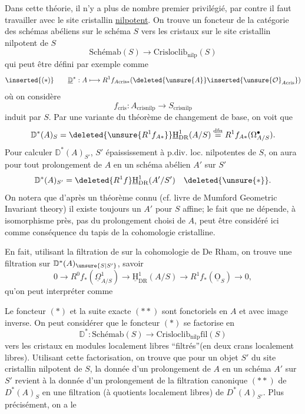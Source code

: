  Dans cette théorie, il n'y a plus de nombre premier privilégié, par contre il faut travailler avec le site cristallin \uline{nilpotent}. On trouve un foncteur  de la catégorie des schémas abéliens sur le schéma $S$ vers les  cristaux sur le site cristallin nilpotent de $S$
\[
\text{Schémab}(S)\longrightarrow\mathrm{Crisloclib}_{\mathrm{nilp}}(S)
\]
qui peut être défini par exemple comme
\[
\inserted{(*)}\qquad \underline{\mathbb D}^{*}:A\longmapsto R^1f_{A\mathrm{cris}*}
(\deleted{\unsure{A}}\inserted{\unsure{\mathcal O}_{A\mathrm{cris}}})
\]
où on considère
\[
f_{\mathrm{cris}}:A_{\mathrm{crisnilp}}\longrightarrow S_{\mathrm{crisnilp}}
\]
induit par $S$. Par une variante du théorème de changement de base, on voit que
\[
\mathbb D^*(A)_S=\deleted{\unsure{R^1f_{A*}}}\underline{\mathrm H}^1_{\mathrm{DR}}(A/S)
\overset{\mathrm{dfn}}=R^1f_{A*}(\Omega^\bullet_{A/S}).
\]
Pour calculer $\mathbb D^*(A)_{S'}$, $S'$ épaississement à p.div. loc. nilpotentes de $S$, on aura pour tout prolongement  de $A$ en un schéma abélien $A'$ sur $S'$
\[
\mathbb D^*(A)_{S'}=\deleted{R^1f}\underline{\mathrm H}^1_{\mathrm{DR}}(A'/S')\quad\deleted{\unsure{*}}.
\]
On notera que d'après un théorème connu (cf. livre de Mumford Geometric Invariant theory) il existe toujours un $A'$ pour $S$ affine; le fait que  ne dépende, à isomorphisme près, pas du prolongement choisi de $A$, peut être considéré ici comme conséquence du tapis de la cohomologie cristalline.

En fait, utilisant la filtration de  sur la cohomologie de De Rham, on trouve une filtration sur $\mathbb D^*(A)_{\unsure{S|S'}}$, savoir
\[
0\longrightarrow R^0f_*(\underline\Omega^1_{A/S})\longrightarrow
\underline{\mathrm H}^1_{\mathrm{DR}}(A/S)\longrightarrow R^1f_*(\underline{\mathrm O}_S)\longrightarrow0,
\]
qu'on peut interpréter comme

Le foncteur $(*)$ et la suite exacte $(**)$ sont fonctoriels en $A$ et  avec image inverse. On peut  considérer que le foncteur $(*)$ se factorise en
\[
\mathbb D^*:\text{Schémab}(S)\longrightarrow\mathrm{Crisloclib}_{\mathrm{nilp}}\mathrm{fil}(S)
\]
vers les cristaux en modules localement libres ``filtrés''(en deux crans localement libres). Utilisant cette factorisation, on trouve que pour un objet $S'$ du site cristallin nilpotent de $S$, la donnée d'un prolongement de $A$ en un schéma  $A'$ sur $S'$ revient à la donnée d'un prolongement de la filtration canonique $(**)$ de $D^*(A)_S$ en une filtration (à quotients localement libres) de $D^*(A)_{S'}$. Plus précisément, on a le

